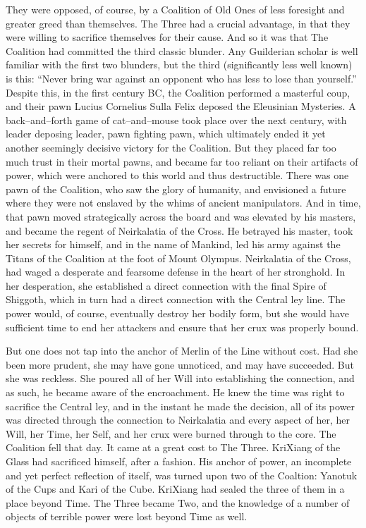 They were opposed, of course, by a Coalition of Old Ones of less foresight and greater greed than themselves. The Three had a crucial advantage, in that they were willing to sacrifice themselves for their cause. And so it was that The Coalition had committed the third classic blunder. Any Guilderian scholar is well familiar with the first two blunders, but the third (significantly less well known) is this: “Never bring war against an opponent who has less to lose than yourself.”
\SomeVSpace
Despite this, in the first century BC, the Coalition performed a masterful coup, and their pawn Lucius Cornelius Sulla Felix deposed the Eleusinian Mysteries. A back\mbox{--}and\mbox{--}forth game of cat\mbox{--}and\mbox{--}mouse took place over the next century, with leader deposing leader, pawn fighting pawn, which ultimately ended it yet another seemingly decisive victory for the Coalition. But they placed far too much trust in their mortal pawns, and became far too reliant on their artifacts of power, which were anchored to this world and thus destructible.
\SmallVSpace
There was one pawn of the Coalition, who saw the glory of humanity, and envisioned a future where they were not enslaved by the whims of ancient manipulators. And in time, that pawn moved strategically across the board and was elevated by his masters, and became the regent of Neirkalatia of the Cross. He betrayed his master, took her secrets for himself, and in the name of Mankind, led his army against the Titans of the Coalition at the foot of Mount Olympus.
\SomeVSpace
Neirkalatia of the Cross, had waged a desperate and fearsome defense in the heart of her stronghold. In her desperation, she established a direct connection with the final Spire of Shiggoth, which in turn had a direct connection with the Central ley line. The power would, of course, eventually destroy her bodily form, but she would have sufficient time to end her attackers and ensure that her crux was properly bound.

But one does not tap into the anchor of Merlin of the Line without cost. Had she been more prudent, she may have gone unnoticed, and may have succeeded. But she was reckless. She poured all of her Will into establishing the connection, and as such, he became aware of the encroachment. He knew the time was right to sacrifice the Central ley, and in the instant he made the decision, all of its power was directed through the connection to Neirkalatia and every aspect of her, her Will, her Time, her Self, and her crux were burned through to the core.
\SmallVSpace
The Coalition fell that day.
\SmallVSpace
It came at a great cost to The Three. KriXiang of the Glass had sacrificed himself, after a fashion. His anchor of power, an incomplete and yet perfect reflection of itself, was turned upon two of the Coaltion: Yanotuk of the Cups and Kari of the Cube. KriXiang had sealed the three of them in a place beyond Time. The Three became Two, and the knowledge of a number of objects of terrible power were lost beyond Time as well.

